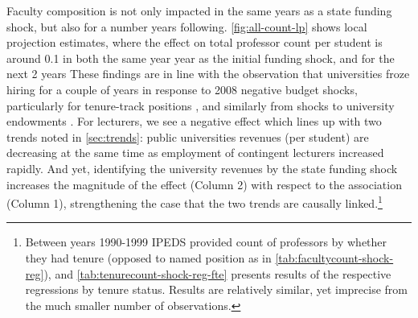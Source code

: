 Faculty composition is not only impacted in the same years as a state funding shock, but also for a number years following.
\autoref{fig:all-count-lp} shows local projection estimates, where the effect on total professor count per student is around 0.1 in both the same year year as the initial funding shock, and for the next 2 years
These findings are in line with the observation that universities froze hiring for a couple of years in response to 2008 negative budget shocks, particularly for tenure-track positions \citep{turner2014impact}, and similarly from shocks to university endowments \citep{brown2014endowment}.
For lecturers, we see a negative effect which lines up with two trends noted in \autoref{sec:trends}: public universities revenues (per student) are decreasing at the same time as employment of contingent lecturers increased rapidly.
And yet, identifying the university revenues by the state funding shock increases the magnitude of the effect (Column 2) with respect to the association (Column 1), strengthening the case that the two trends are causally linked.\footnote{
    Between years 1990-1999 IPEDS provided count of professors by whether they had tenure (opposed to named position as in \autoref{tab:facultycount-shock-reg}), and \autoref{tab:tenurecount-shock-reg-fte} presents results of the respective regressions by tenure status.
    Results are relatively similar, yet imprecise from the much smaller number of observations.
}

